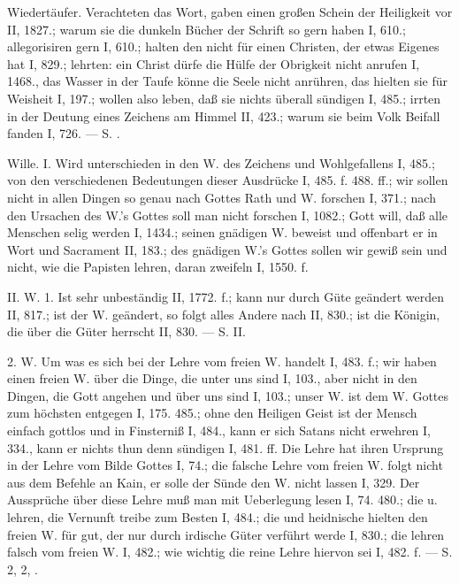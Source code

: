 Wiedertäufer. Verachteten das Wort, gaben einen großen Schein der Heiligkeit vor II, 1827.; warum sie die dunkeln Bücher der Schrift so gern haben I, 610.; allegorisiren gern I, 610.; halten den nicht für einen Christen, der etwas Eigenes hat I, 829.; lehrten: ein Christ dürfe die Hülfe der Obrigkeit nicht anrufen I, 1468., das Wasser in der Taufe könne die Seele nicht anrühren, das hielten sie für Weisheit I, 197.; wollen also leben, daß sie nichts überall sündigen I, 485.; irrten in der Deutung eines Zeichens am Himmel II, 423.; warum sie beim Volk Beifall fanden I, 726. — S. .

Wille. I.  Wird unterschieden in den W. des Zeichens und Wohlgefallens I, 485.; von den verschiedenen Bedeutungen dieser Ausdrücke I, 485. f. 488. ff.; wir sollen nicht in allen Dingen so genau nach Gottes Rath und W. forschen I, 371.; nach den Ursachen des W.’s Gottes soll man nicht forschen I, 1082.; Gott will, daß alle Menschen selig werden I, 1434.; seinen gnädigen W. beweist und offenbart er in Wort und Sacrament II, 183.; des gnädigen W.’s Gottes sollen wir gewiß sein und nicht, wie die Papisten lehren, daran zweifeln I, 1550. f.

II.  W. 1.  Ist sehr unbeständig II, 1772. f.; kann nur durch Güte geändert werden II, 817.; ist der W. geändert, so folgt alles Andere nach II, 830.; ist die Königin, die über die Güter herrscht II, 830. — S.  II.

2.  W. Um was es sich bei der Lehre vom freien W. handelt I, 483. f.; wir haben einen freien W. über die Dinge, die unter uns sind I, 103., aber nicht in den Dingen, die Gott angehen und über uns sind I, 103.; unser W. ist dem W. Gottes zum höchsten entgegen I, 175. 485.; ohne den Heiligen Geist ist der Mensch einfach gottlos und in Finsterniß I, 484., kann er sich Satans nicht erwehren I, 334., kann er nichts thun denn sündigen I, 481. ff. Die  Lehre hat ihren Ursprung in der Lehre vom Bilde Gottes I, 74.; die falsche Lehre vom freien W. folgt nicht aus dem Befehle an Kain, er solle der Sünde den W. nicht lassen I, 329. Der  Aussprüche über diese Lehre muß man mit Ueberlegung lesen I, 74. 480.; die  u.  lehren, die Vernunft treibe zum Besten I, 484.; die  und heidnische  hielten den freien W. für gut, der nur durch irdische Güter verführt werde I, 830.; die  lehren falsch vom freien W. I, 482.; wie wichtig die reine Lehre hiervon sei I, 482. f. — S.  2,  2, .

